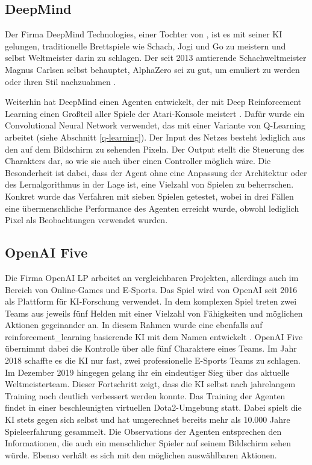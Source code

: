 \subsection{DeepMind}
Der Firma DeepMind Technologies, einer Tochter von , ist es mit seiner KI  \cite{deepmind_alphazero} \cite{google_deep_mind} gelungen, traditionelle Brettspiele wie Schach, Jogi und Go zu meistern und selbst Weltmeister darin zu schlagen. Der seit 2013 amtierende Schachweltmeister Magnus Carlsen selbst behauptet, AlphaZero sei zu gut, um emuliert zu werden oder ihren Stil nachzuahmen \cite{carlsen_chess}.

Weiterhin hat DeepMind einen Agenten entwickelt, der mit Deep Reinforcement Learning einen Großteil aller Spiele der Atari-Konsole meistert \cite{deepmind_atari_paper}. Dafür wurde ein Convolutional Neural Network verwendet, das mit einer Variante von Q-Learning arbeitet (siehe Abschnitt \ref{q-learning}). Der Input des Netzes besteht lediglich aus den auf dem Bildschirm zu sehenden Pixeln. Der Output stellt die Steuerung des Charakters dar, so wie sie auch über einen Controller möglich wäre. Die Besonderheit ist dabei, dass der Agent ohne eine Anpassung der Architektur oder des Lernalgorithmus in der Lage ist, eine Vielzahl von Spielen zu beherrschen. Konkret wurde das Verfahren mit sieben Spielen getestet, wobei in drei Fällen eine übermenschliche Performance des Agenten erreicht wurde, obwohl lediglich Pixel als Beobachtungen verwendet wurden.

\subsection{OpenAI Five}
Die Firma OpenAI LP arbeitet an vergleichbaren Projekten, allerdings auch im Bereich von Online-Games und E-Sports. Das Spiel  \cite{dota_2} wird von OpenAI seit 2016 als Plattform für KI-Forschung verwendet. In dem komplexen Spiel treten zwei Teams aus jeweils fünf Helden mit einer Vielzahl von Fähigkeiten und möglichen Aktionen gegeinander an. In diesem Rahmen wurde eine ebenfalls auf \ac{reinforcement_learning} basierende KI mit dem Namen  entwickelt \cite{openai_five} \cite{openai_five_paper}. OpenAI Five übernimmt dabei die Kontrolle über alle fünf Charaktere eines Teams. Im Jahr 2018 schaffte es die KI nur fast, zwei professionelle E-Sports Teams zu schlagen. Im Dezember 2019 hingegen gelang ihr ein eindeutiger Sieg über das aktuelle Weltmeisterteam. Dieser Fortschritt zeigt, dass die KI selbst nach jahrelangem Training noch deutlich verbessert werden konnte.
Das Training der Agenten findet in einer beschleunigten virtuellen Dota2-Umgebung statt. Dabei spielt die KI stets gegen sich selbst und hat umgerechnet bereits mehr als 10.000 Jahre Spieleerfahrung gesammelt. Die Observations der Agenten entsprechen den Informationen, die auch ein menschlicher Spieler auf seinem Bildschirm sehen würde. Ebenso verhält es sich mit den möglichen auswählbaren Aktionen.

